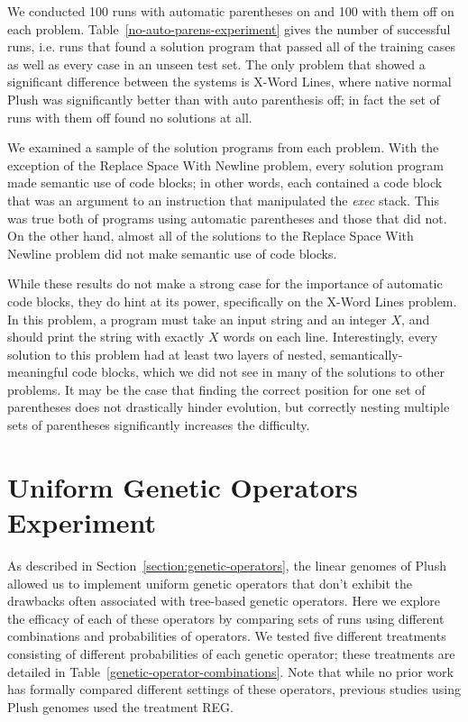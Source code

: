 \documentclass[graybox]{svmult}
\begin{document}
We conducted 100 runs with automatic parentheses on and 100 with them off on each problem. Table~\ref{no-auto-parens-experiment} gives the number of successful runs, i.e. runs that found a solution program that passed all of the training cases as well as every case in an unseen test set. The only problem that showed a significant difference between the systems is X-Word Lines, where native normal Plush was significantly better than with auto parenthesis off; in fact the set of runs with them off found no solutions at all.

We examined a sample of the solution programs from each problem. With the exception of the Replace Space With Newline problem, every solution program made semantic use of code blocks; in other words, each contained a code block that was an argument to an instruction that manipulated the \textit{exec} stack. This was true both of programs using automatic parentheses and those that did not. On the other hand, almost all of the solutions to the Replace Space With Newline problem did not make semantic use of code blocks.

While these results do not make a strong case for the importance of automatic code blocks, they do hint at its power, specifically on the X-Word Lines problem. In this problem, a program must take an input string and an integer $X$, and should print the string with exactly $X$ words on each line. Interestingly, every solution to this problem had at least two layers of nested, semantically-meaningful code blocks, which we did not see in many of the solutions to other problems. It may be the case that finding the correct position for one set of parentheses does not drastically hinder evolution, but correctly nesting multiple sets of parentheses significantly increases the difficulty.


\section{Uniform Genetic Operators Experiment}

As described in Section~\ref{section:genetic-operators}, the linear genomes of Plush allowed us to implement uniform genetic operators that don't exhibit the 
drawbacks often associated with tree-based genetic operators. Here we explore the efficacy of each of these operators by comparing sets of runs using different combinations and probabilities of operators. We tested five different treatments consisting of different probabilities of each genetic operator; these treatments are detailed in Table~\ref{genetic-operator-combinations}. Note that while no prior work has formally compared different settings of these operators, previous studies using Plush genomes \cite{Helmuth:2015:GECCO, Helmuth:2015:GPTP, McPhee:2015:GPTP} used the treatment REG.
\end{document}
